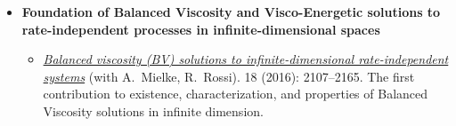\documentclass[reqno,11pt]{article}
\theoremstyle{plain}
\begin{document}
\begin{itemize}[wide,
  topsep=-0.5\parsep,
  itemsep=-4pt,
  leftmargin=12pt,
  ]
\begin{itemize}[
  topsep=-2\parsep,
  itemsep=-2pt,
  leftmargin=12pt,
  itemindent=-12pt
  ]
  \item%
\href{https://doi.org/10.1007/S00222-017-0759-8}{\emph{Optimal entropy-transport problems and a new
    Hellinger-Kantorovich distance between positive measures}}
  (with M.~Liero, A.~Mielke).
   211 (2018): 969--1117. %
\end{itemize}

  \item \textbf{Foundation of Balanced Viscosity and Visco-Energetic solutions
to rate-independent processes in infinite-dimensional spaces}

\begin{itemize}[
  topsep=-2\parsep,
  itemsep=-2pt,
  leftmargin=12pt,
  itemindent=-12pt
  ]
\renewcommand{\labelitemii}{}
  \item%
\href{https://doi.org/10.4171/JEMS/639}{\emph{Balanced viscosity (BV) solutions to infinite-dimensional
  rate-independent systems}} (with A.~Mielke, R.~Rossi).
 18 (2016): 2107--2165. %
{\small\textsf{The first contribution to existence, characterization,
  and properties of Balanced 
  Viscosity solutions
in infinite dimension.}}

  







\end{itemize}
\end{itemize}
\end{document}
